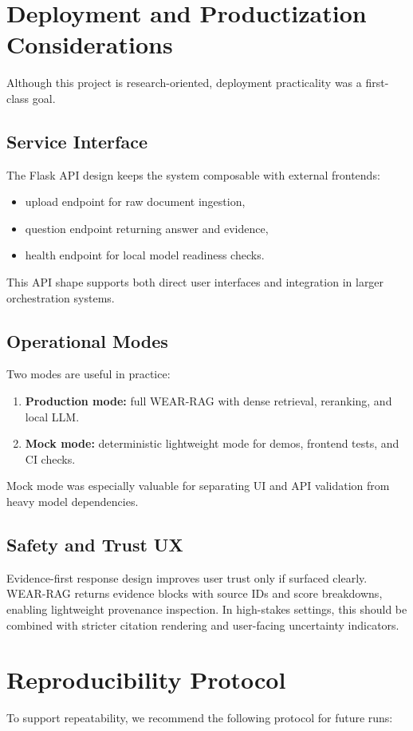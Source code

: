 \documentclass[10pt,draftclsnofoot,onecolumn,journal]{IEEEtran}
\begin{document}
\section{Deployment and Productization Considerations}
Although this project is research-oriented, deployment practicality was a first-class goal.

\subsection{Service Interface}
The Flask API design keeps the system composable with external frontends:
\begin{itemize}
\item upload endpoint for raw document ingestion,
\item question endpoint returning answer and evidence,
\item health endpoint for local model readiness checks.
\end{itemize}

This API shape supports both direct user interfaces and integration in larger orchestration systems.

\subsection{Operational Modes}
Two modes are useful in practice:
\begin{enumerate}
\item \textbf{Production mode:} full WEAR-RAG with dense retrieval, reranking, and local LLM.
\item \textbf{Mock mode:} deterministic lightweight mode for demos, frontend tests, and CI checks.
\end{enumerate}

Mock mode was especially valuable for separating UI and API validation from heavy model dependencies.

\subsection{Safety and Trust UX}
Evidence-first response design improves user trust only if surfaced clearly. WEAR-RAG returns evidence blocks with source IDs and score breakdowns, enabling lightweight provenance inspection. In high-stakes settings, this should be combined with stricter citation rendering and user-facing uncertainty indicators.

\section{Reproducibility Protocol}
To support repeatability, we recommend the following protocol for future runs:
\end{document}
